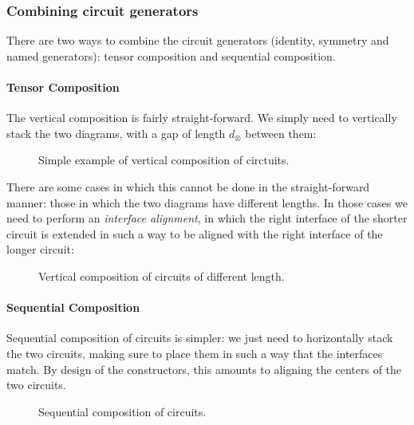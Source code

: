 \documentclass{article}
\begin{document}
\subsubsection{Combining circuit generators}

There are two ways to combine the circuit generators (identity, symmetry and named generators): tensor composition and sequential composition.

\paragraph{Tensor Composition} The vertical composition is fairly straight-forward. We simply need to vertically stack the two diagrams, with a gap of length $d_\otimes$ between them:

\begin{figure}[ht]
\caption{Simple example of vertical composition of circtuits.}
\end{figure}

There are some cases in which this cannot be done in the straight-forward manner: those in which the two diagrams have different lengths. In those cases we need to perform an \emph{interface alignment}, in which the right interface of the shorter circuit is extended in such a way to be aligned with the right interface of the longer circuit:

\begin{figure}[ht]
\caption{Vertical composition of circuits of different length.}
\end{figure}

\paragraph{Sequential Composition} Sequential composition of circuits is simpler: we just need to horizontally stack the two circuits, making sure to place them in such a way that the interfaces match. By design of the constructors, this amounts to aligning the centers of the two circuits.

\begin{figure}[ht]
\caption{Sequential composition of circuits.}
\end{figure}
\end{document}
